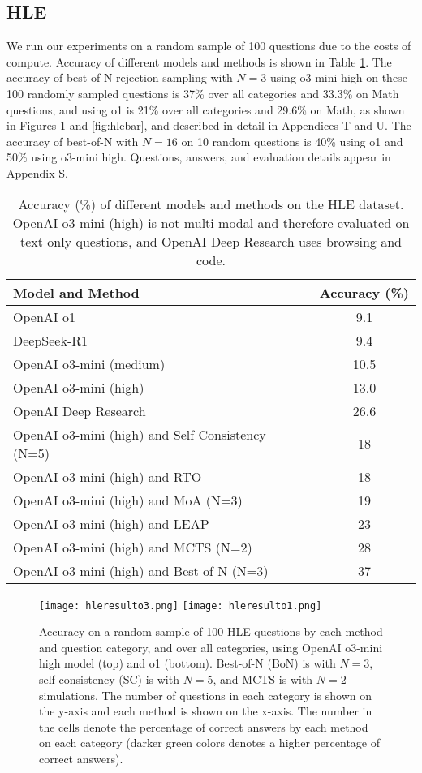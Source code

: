 \subsection{HLE}
We run our experiments on a random sample of 100 questions due to the costs of compute. Accuracy of different models and methods is shown in Table \ref{tab:hle_acc}. The accuracy of best-of-N rejection sampling with $N=3$ using o3-mini high on these 100 randomly sampled questions is 37\% over all categories and 33.3\% on Math questions, and using o1 is 21\% over all categories and 29.6\% on Math, as shown in Figures \ref{fig:hletable} and \ref{fig:hlebar}, and described in detail in Appendices T and U. The accuracy of best-of-N with $N=16$ on 10 random questions is 40\% using o1 and 50\% using o3-mini high. Questions, answers, and evaluation details appear in Appendix S.

\begin{table}[H]
\caption{Accuracy (\%) of different models and methods on the HLE dataset. OpenAI o3-mini (high) is not multi-modal and therefore evaluated on text only questions, and OpenAI Deep Research uses browsing and code.}
\label{tab:hle_acc}
\begin{center}
\scriptsize
\begin{tabular}{l c}
\toprule
\textbf{Model and Method} & \textbf{Accuracy (\%)} \\
\midrule
OpenAI o1               & 9.1  \\
DeepSeek-R1             & 9.4  \\
OpenAI o3-mini (medium) & 10.5 \\
OpenAI o3-mini (high)   & 13.0 \\
OpenAI Deep Research    & 26.6 \\
OpenAI o3-mini (high) and Self Consistency (N=5) & 18 \\
OpenAI o3-mini (high) and RTO & 18 \\
OpenAI o3-mini (high) and MoA (N=3) & 19 \\
OpenAI o3-mini (high) and LEAP & 23 \\
OpenAI o3-mini (high) and MCTS (N=2) & 28 \\
OpenAI o3-mini (high) and Best-of-N (N=3) & 37 \\
\bottomrule
\end{tabular}
\end{center}
\end{table}


\begin{figure}[H]
  \centering
  \texttt{[image: hleresulto3.png]}
  \texttt{[image: hleresulto1.png]}
  \caption{Accuracy on a random sample of 100 HLE questions by each method and question category, and over all categories, using OpenAI o3-mini high model (top) and o1 (bottom). Best-of-N (BoN) is with $N=3$, self-consistency (SC) is with $N=5$, and MCTS is with $N=2$ simulations. The number of questions in each category is shown on the y-axis and each method is shown on the x-axis. The number in the cells denote the percentage of correct answers by each method on each category (darker green colors denotes a higher percentage of correct answers).}
  \label{fig:hletable}
\end{figure}

